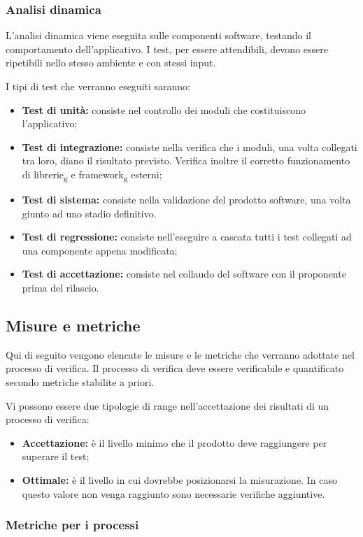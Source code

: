 \documentclass[12pt,a4paper,titlepage]{article}
\begin{document}
		\subsubsection{Analisi dinamica}
		L'analisi dinamica viene eseguita sulle componenti software, testando il comportamento dell'applicativo. I test, per essere attendibili, devono essere ripetibili nello stesso ambiente e con stessi input.
		
		I tipi di test che verranno eseguiti saranno:
		\begin{itemize}
			\item \textbf{Test di unità:} consiste nel controllo dei moduli che costituiscono l'applicativo;
			\item \textbf{Test di integrazione:} consiste nella verifica che i moduli, una volta collegati tra loro, diano il risultato previsto. Verifica inoltre il corretto funzionamento di librerie\textsubscript{g} e framework\textsubscript{g} esterni;
			\item \textbf{Test di sistema:} consiste nella validazione del prodotto software, una volta giunto ad uno stadio definitivo.
			\item \textbf{Test di regressione:} consiste nell'eseguire a cascata tutti i test collegati ad una componente appena modificata;
			\item \textbf{Test di accettazione:} consiste nel collaudo del software con il proponente prima del rilascio.
			
		\end{itemize}
	\subsection{Misure e metriche}
	\label{MisureMetriche}
	Qui di seguito vengono elencate le misure e le metriche che verranno adottate nel processo di verifica. Il processo di verifica deve essere verificabile e quantificato secondo metriche stabilite a priori.
	
	Vi possono essere due tipologie di range nell'accettazione dei risultati di un processo di verifica:
	\begin{itemize}
		\item \textbf{Accettazione:} è il livello minimo che il prodotto deve raggiungere per superare il test;
		\item \textbf{Ottimale:} è il livello in cui dovrebbe posizionarsi la misurazione. In caso questo valore non venga raggiunto sono necessarie verifiche aggiuntive.
	\end{itemize}
		\subsubsection{Metriche per i processi}
\end{document}
